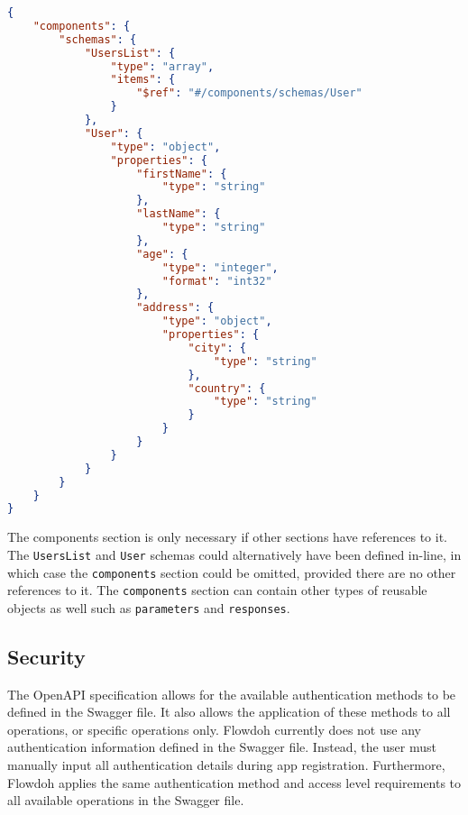 \begin{lstlisting}[caption={Components section with schemas},label={code:components},language=json]
{
    "components": {
        "schemas": {
            "UsersList": {
                "type": "array",
                "items": {
                    "$ref": "#/components/schemas/User"
                }
            },
            "User": {
                "type": "object",
                "properties": {
                    "firstName": {
                        "type": "string"
                    },
                    "lastName": {
                        "type": "string"
                    },
                    "age": {
                        "type": "integer",
                        "format": "int32"
                    },
                    "address": {
                        "type": "object",
                        "properties": {
                            "city": {
                                "type": "string"
                            },
                            "country": {
                                "type": "string"
                            }
                        }
                    }
                }
            }
        }
    }
}
\end{lstlisting}
The components section is only necessary if other sections have references to it. The \texttt{UsersList} and \texttt{User} schemas could alternatively have been defined in-line, in which case the \texttt{components} section could be omitted, provided there are no other references to it. The \texttt{components} section can contain other types of reusable objects as well such as \texttt{parameters} and \texttt{responses}.

\subsection{Security}
The OpenAPI specification allows for the available authentication methods to be defined in the Swagger file. It also allows the application of these methods to all operations, or specific operations only. Flowdoh currently does not use any authentication information defined in the Swagger file. Instead, the user must manually input all authentication details during app registration. Furthermore, Flowdoh applies the same authentication method and access level requirements to all available operations in the Swagger file.


